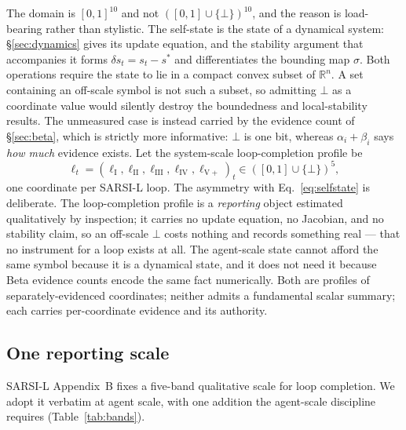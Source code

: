 \documentclass[11pt]{article}
\begin{document}
The domain is $[0,1]^{10}$ and not $([0,1]\cup\{\bot\})^{10}$, and the reason is load-bearing rather than stylistic. The self-state is the state of a dynamical system: \S\ref{sec:dynamics} gives its update equation, and the stability argument that accompanies it forms $\delta s_t = s_t - s^*$ and differentiates the bounding map $\sigma$. Both operations require the state to lie in a compact convex subset of $\mathbb{R}^{n}$. A set containing an off-scale symbol is not such a subset, so admitting $\bot$ as a coordinate value would silently destroy the boundedness and local-stability results. The unmeasured case is instead carried by the evidence count of \S\ref{sec:beta}, which is strictly more informative: $\bot$ is one bit, whereas $\alpha_i+\beta_i$ says \emph{how much} evidence exists. Let the system-scale loop-completion profile be
\begin{equation}
\ell_t = (\ell_{\mathrm{I}}, \ell_{\mathrm{II}}, \ell_{\mathrm{III}}, \ell_{\mathrm{IV}}, \ell_{\mathrm{V+}})_t \in ([0,1] \cup \{\bot\})^{5},
\label{eq:loopstate}
\end{equation}
one coordinate per SARSI-L loop. The asymmetry with Eq.~\eqref{eq:selfstate} is deliberate. The loop-completion profile is a \emph{reporting} object estimated qualitatively by inspection; it carries no update equation, no Jacobian, and no stability claim, so an off-scale $\bot$ costs nothing and records something real --- that no instrument for a loop exists at all. The agent-scale state cannot afford the same symbol because it is a dynamical state, and it does not need it because Beta evidence counts encode the same fact numerically. Both are profiles of separately-evidenced coordinates; neither admits a fundamental scalar summary; each carries per-coordinate evidence and its authority.

\subsection{One reporting scale}
SARSI-L Appendix~B fixes a five-band qualitative scale for loop completion. We adopt it verbatim at agent scale, with one addition the agent-scale discipline requires (Table~\ref{tab:bands}).
\end{document}
